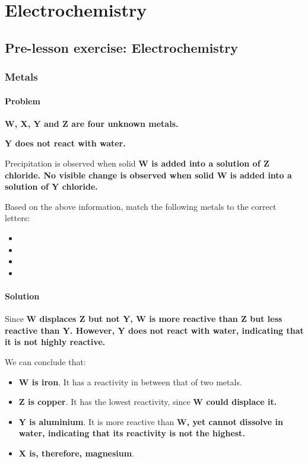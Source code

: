 \chapter{Electrochemistry}

\section{Pre-lesson exercise: Electrochemistry}
\subsection{Metals}
\subsubsection{Problem}
\bf{W}, \bf{X}, \bf{Y} and \bf{Z} are four unknown metals.

\bf{Y} does not react with water.

Precipitation is observed when solid \bf{W} is added into a solution of \bf{Z}
chloride.  No visible change is observed when solid \bf{W} is added into a solution
of \bf{Y} chloride.

Based on the above information, match the following metals to the correct
letters:
\begin{itemize}
	\item {}
	\item {}
	\item {}
	\item {}
\end{itemize}

\subsubsection{Solution}

Since \bf{W} displaces \bf{Z} but not \bf{Y}, \bf{W} is more reactive than \bf{Z}
but less reactive than \bf{Y}. However, \bf{Y} does not react with water,
indicating that it is not highly reactive.

We can conclude that:
\begin{itemize}
	\item {\color{accent} \bf{W} is iron}. It has a reactivity in between that of two metals.
	\item {\color{accent} \bf{Z} is copper}. It has the lowest reactivity, since \bf{W} could displace it.
	\item {\color{accent} \bf{Y} is aluminium}. It is more reactive than \bf{W}, yet cannot dissolve in water, indicating that its reactivity is not the highest.
	\item {\color{accent} \bf{X} is, therefore, magnesium}.
\end{itemize}

